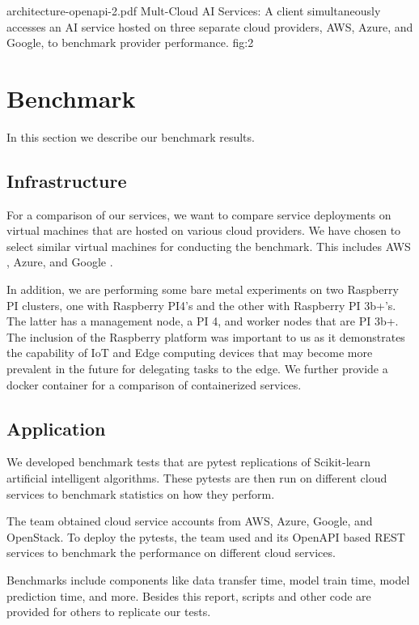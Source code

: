 \OneFIGURE
  {architecture-openapi-2.pdf}
  {Mult-Cloud AI Services: A client simultaneously accesses an AI service hosted
   on three separate cloud providers, AWS, Azure, and Google, to benchmark
   provider performance.}
  {fig:2}
 

\section{Benchmark}
\label{sec:benchmark}

In this section we describe our benchmark results.

\subsection{Infrastructure}

For a comparison of our services, we want to compare service
deployments on virtual machines that are hosted on various cloud
providers. We have chosen to select similar virtual machines for
conducting the benchmark. This includes AWS \cite{www-aws},
Azure\cite{www-azure}, and Google \cite{www-google}.

In addition, we are performing some bare metal experiments on two
Raspberry PI clusters, one with Raspberry PI4's and the other with
Raspberry PI 3b+'s. The latter has a management node, a PI 4, and
worker nodes that are PI 3b+. The inclusion of the Raspberry platform
was important to us as it demonstrates the capability of IoT and Edge
computing devices that may become more prevalent in the future for
delegating tasks to the edge. We further provide a docker container
for a comparison of containerized services.


\subsection{Application}

We developed benchmark tests that are pytest replications of
Scikit-learn artificial intelligent algorithms. These pytests are then
run on different cloud services to benchmark statistics on how they
perform.

The team obtained cloud service accounts from AWS, Azure, Google, and
OpenStack. To deploy the pytests, the team used \Cloudmesh and its
OpenAPI based REST services to benchmark the performance on different
cloud services.

Benchmarks include components like data transfer time, model train
time, model prediction time, and more. Besides this report, scripts
and other code are provided for others to replicate our tests.

